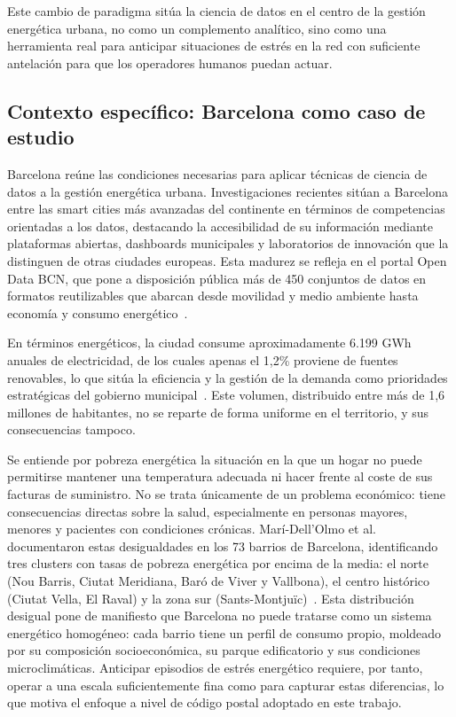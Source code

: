 \documentclass[12pt, a4paper]{article}
\begin{document}
Este cambio de paradigma sitúa la ciencia de datos en el centro de la gestión energética urbana, no como un complemento analítico, sino como una herramienta real para anticipar situaciones de estrés en la red con suficiente antelación para que los operadores humanos puedan actuar.

\subsection{Contexto específico: Barcelona como caso de estudio}

Barcelona reúne las condiciones necesarias para aplicar técnicas de ciencia de datos a la gestión energética urbana. Investigaciones recientes sitúan a Barcelona entre las smart cities más avanzadas del continente en términos de competencias orientadas a los datos, destacando la accesibilidad de su información mediante plataformas abiertas, dashboards municipales y laboratorios de innovación que la distinguen de otras ciudades europeas. Esta madurez se refleja en el portal Open Data BCN, que pone a disposición pública más de 450 conjuntos de datos en formatos reutilizables que abarcan desde movilidad y medio ambiente hasta economía y consumo energético~\cite{krogstie2020}.

En términos energéticos, la ciudad consume aproximadamente 6.199 GWh anuales de electricidad, de los cuales apenas el 1,2\% proviene de fuentes renovables, lo que sitúa la eficiencia y la gestión de la demanda como prioridades estratégicas del gobierno municipal~\cite{ajuntament2022}. Este volumen, distribuido entre más de 1,6 millones de habitantes, no se reparte de forma uniforme en el territorio, y sus consecuencias tampoco.

Se entiende por pobreza energética la situación en la que un hogar no puede permitirse mantener una temperatura adecuada ni hacer frente al coste de sus facturas de suministro. No se trata únicamente de un problema económico: tiene consecuencias directas sobre la salud, especialmente en personas mayores, menores y pacientes con condiciones crónicas. Marí-Dell'Olmo et al. documentaron estas desigualdades en los 73 barrios de Barcelona, identificando tres clusters con tasas de pobreza energética por encima de la media: el norte (Nou Barris, Ciutat Meridiana, Baró de Viver y Vallbona), el centro histórico (Ciutat Vella, El Raval) y la zona sur (Sants-Montjuïc)~\cite{maridelolmo2022}. Esta distribución desigual pone de manifiesto que Barcelona no puede tratarse como un sistema energético homogéneo: cada barrio tiene un perfil de consumo propio, moldeado por su composición socioeconómica, su parque edificatorio y sus condiciones microclimáticas. Anticipar episodios de estrés energético requiere, por tanto, operar a una escala suficientemente fina como para capturar estas diferencias, lo que motiva el enfoque a nivel de código postal adoptado en este trabajo.
\end{document}
